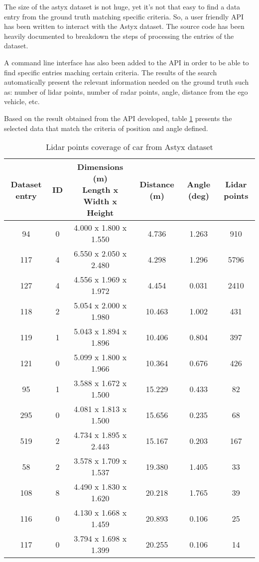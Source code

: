 \documentclass{scrartcl}
\begin{document}
  The size of the astyx dataset is not huge, yet it's not that easy to find
  a data entry from the ground truth matching specific criteria. So, a user
  friendly API has been written to interact with the Astyx dataset.
  The source code has been heavily documented to breakdown the steps of
  processing the entries of the dataset.

  A command line interface has also been added to the API in order to be able
  to find specific entries maching certain criteria. The results of the search
  automatically present the relevant information needed on the ground truth
  such as: number of lidar points, number of radar points, angle, distance from
  the ego vehicle, etc.

  Based on the result obtained from the API developed, table
  \ref{table:astyx-lidar-data} presents the selected data that match the
  criteria of position and angle defined.

  \begin{table}[!htbp]
    \centering
    \caption{Lidar points coverage of car from Astyx dataset}
    \begin{tabular}{ | c | c | c | c | c | c |}
      \hline
      \textbf{Dataset entry} & \textbf{ID} & 
      \makecell{\textbf{Dimensions (m)} \\ Length x Width x Height} &
      \textbf{Distance (m)} & \textbf{Angle (deg)} & \textbf{Lidar points} \\
      \hline \hline
      94 & 0 & 4.000 x 1.800 x 1.550 & 4.736 & 1.263 & 910 \\
      117 & 4 & 6.550 x 2.050 x 2.480 & 4.298 & 1.296 & 5796 \\
      127 & 4 & 4.556 x 1.969 x 1.972 & 4.454 & 0.031 & 2410 \\
      \hline
      \hline
      118 & 2 & 5.054 x 2.000 x 1.980 & 10.463 & 1.002 & 431 \\
      119 & 1 & 5.043 x 1.894 x 1.896 & 10.406 & 0.804 & 397 \\
      121 & 0 & 5.099 x 1.800 x 1.966 & 10.364 & 0.676 & 426 \\
      \hline
      \hline
      95 & 1 & 3.588 x 1.672 x 1.500 & 15.229 & 0.433 & 82 \\
      295 & 0 & 4.081 x 1.813 x 1.500 & 15.656 & 0.235 & 68 \\
      519 & 2 & 4.734 x 1.895 x 2.443 & 15.167 & 0.203 & 167 \\
      \hline
      \hline
      58 & 2 & 3.578 x 1.709 x 1.537 & 19.380 & 1.405 & 33 \\
      108 & 8 & 4.490 x 1.830 x 1.620 & 20.218 & 1.765 & 39 \\
      116 & 0 & 4.130 x 1.668 x 1.459 & 20.893 & 0.106 & 25 \\
      117 & 0 & 3.794 x 1.698 x 1.399 & 20.255 & 0.106 & 14 \\
      \hline
    \end{tabular}
    \label{table:astyx-lidar-data}
  \end{table}
\end{document}
